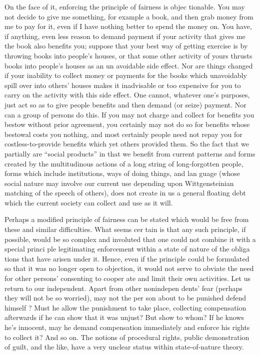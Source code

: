 \documentclass[11pt,openany]{book}
\begin{document}
On the face of it, enforcing the principle of fairness is objec tionable. You may not decide to give me something, for example a book, and then grab money from me to pay for it, even if I have nothing better to spend the money on. You have, if anything, even less reason to demand payment if your activity that gives me the book also benefits you; suppose that your best way of getting exercise is by throwing books into people's houses, or that some other activity of yours thrusts books into people's houses as an un avoidable side effect. Nor are things changed if your inability to collect money or payments for the books which unavoidably spill over into others' houses makes it inadvisable or too expensive for you to carry on the activity with this side effect. One cannot, whatever one's purposes, just act so as to give people benefits and then demand (or seize) payment. Nor can a group of persons do this. If you may not charge and collect for benefits you bestow without prior agreement, you certainly may not do so for benefits whose bestowal costs you nothing, and most certainly people need not repay you for costless-to-provide benefits which yet others provided them. So the fact that we partially are ``social products'' in that we benefit from current patterns and forms created by the multitudinous actions of a long string of long-forgotten people, forms which include institutions, ways of doing things, and lan guage (whose social nature may involve our current use depending upon Wittgensteinian matching of the speech of others), does not create in us a general floating debt which the current society can collect and use as it will. 

Perhaps a modified principle of fairness can be stated which would be free from these and similar difficulties. What seems cer tain is that any such principle, if possible, would be so complex and involuted that one could not combine it with a special princi ple legitimating enforcement within a state of nature of the obliga tions that have arisen under it. Hence, even if the principle could be formulated so that it was no longer open to objection, it would not serve to obviate the need for other persons' consenting to cooper ate and limit their own activities. Let us return to our independent. Apart from other nonindepen dents' fear (perhaps they will not be so worried), may not the per son about to be punished defend himself ? Must he allow the punishment to take place, collecting compensation afterwards if he can show that it was unjust? But show to whom? If he knows he's innocent, may he demand compensation immediately and enforce his rights to collect it? And so on. The notions of procedural rights, public demonstration of guilt, and the like, have a very unclear status within state-of-nature theory. 
\end{document}
